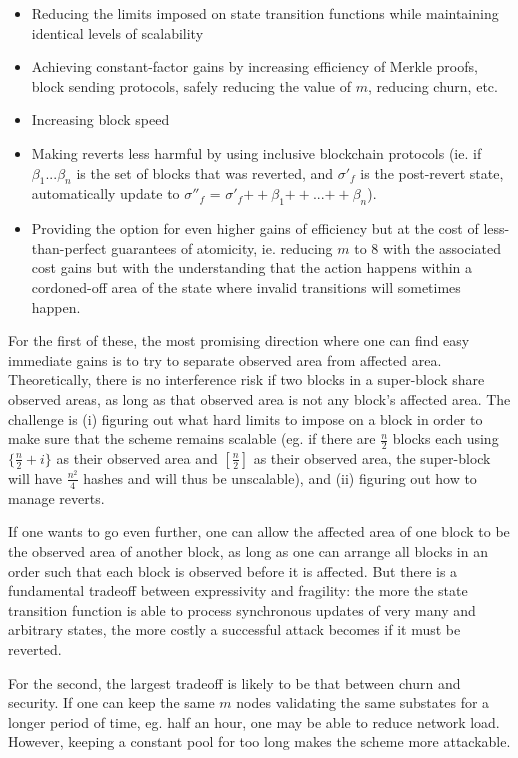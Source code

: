 \documentclass[11pt,a4paper]{report}
\theoremstyle{plain}
\theoremstyle{definition}
\theoremstyle{remark}
\begin{document}
\begin{itemize}
\item
Reducing the limits imposed on state transition functions while maintaining identical levels of scalability
\item
Achieving constant-factor gains by increasing efficiency of Merkle proofs, block sending protocols, safely reducing the value of $m$, reducing churn, etc.
\item
Increasing block speed
\item
Making reverts less harmful by using inclusive blockchain protocols (ie. if $\beta_1 ... \beta_n$ is the set of blocks that was reverted, and $\sigma'_f$ is the post-revert state, automatically update to $\sigma''_f$ = $\sigma'_f {++} \beta_1 {++} ... {++} \beta_n$).
\item
Providing the option for even higher gains of efficiency but at the cost of less-than-perfect guarantees of atomicity, ie. reducing $m$ to $8$ with the associated cost gains but with the understanding that the action happens within a cordoned-off area of the state where invalid transitions will sometimes happen.
\end{itemize}

For the first of these, the most promising direction where one can find easy immediate gains is to try to separate observed area from affected area. Theoretically, there is no interference risk if two blocks in a super-block share observed areas, as long as that observed area is not any block's affected area. The challenge is (i) figuring out what hard limits to impose on a block in order to make sure that the scheme remains scalable (eg. if there are $\frac{n}{2}$ blocks each using $\{\frac{n}{2}+i\}$ as their observed area and $[\frac{n}{2}]$ as their observed area, the super-block will have $\frac{n^2}{4}$ hashes and will thus be unscalable), and (ii) figuring out how to manage reverts.

If one wants to go even further, one can allow the affected area of one block to be the observed area of another block, as long as one can arrange all blocks in an order such that each block is observed before it is affected. But there is a fundamental tradeoff between expressivity and fragility: the more the state transition function is able to process synchronous updates of very many and arbitrary states, the more costly a successful attack becomes if it must be reverted.

For the second, the largest tradeoff is likely to be that between churn and security. If one can keep the same $m$ nodes validating the same substates for a longer period of time, eg. half an hour, one may be able to reduce network load. However, keeping a constant pool for too long makes the scheme more attackable.
\end{document}

